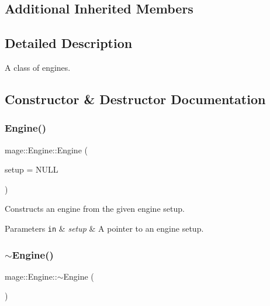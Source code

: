 \subsection*{Additional Inherited Members}


\subsection{Detailed Description}
A class of engines. 

\subsection{Constructor \& Destructor Documentation}
\hypertarget{classmage_1_1_engine_a5b49f3adf1dd889bb38f5325fd6db317}{}\label{classmage_1_1_engine_a5b49f3adf1dd889bb38f5325fd6db317} 
\subsubsection{\texorpdfstring{Engine()}{Engine()}}
{\footnotesize\ttfamily mage\+::\+Engine\+::\+Engine (\begin{DoxyParamCaption}\item[{const \hyperlink{structmage_1_1_engine_setup}{Engine\+Setup} $\ast$}]{setup = {\ttfamily NULL} }\end{DoxyParamCaption})}

Constructs an engine from the given engine setup.


\begin{DoxyParams}[1]{Parameters}
\mbox{\tt in}  & {\em setup} & A pointer to an engine setup. \\
\hline
\end{DoxyParams}
\hypertarget{classmage_1_1_engine_a34628556f8397d70ed018d71e343c2f5}{}\label{classmage_1_1_engine_a34628556f8397d70ed018d71e343c2f5} 
\subsubsection{\texorpdfstring{$\sim$\+Engine()}{~Engine()}}
{\footnotesize\ttfamily mage\+::\+Engine\+::$\sim$\+Engine (\begin{DoxyParamCaption}{ }\end{DoxyParamCaption})\hspace{0.3cm}{\ttfamily [virtual]}}

